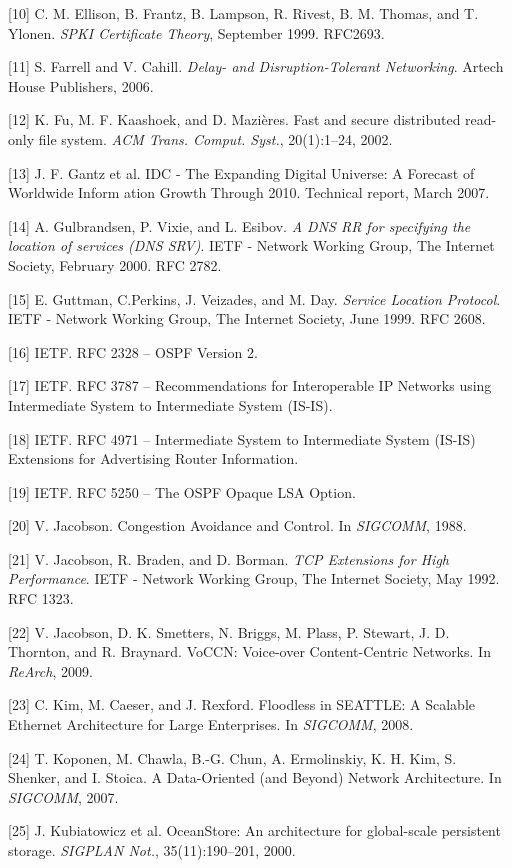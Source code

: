 [10] C. M. Ellison, B. Frantz, B. Lampson, R. Rivest, B. M. Thomas, and T. Ylonen. \emph{SPKI Certificate Theory}, September 1999. RFC2693.

[11] S. Farrell and V. Cahill. \emph{Delay- and Disruption-Tolerant Networking}. Artech House Publishers, 2006.

[12] K. Fu, M. F. Kaashoek, and D. Mazières. Fast and secure distributed read-only file system. \emph{ACM Trans. Comput. Syst.}, 20(1):1–24, 2002.

[13] J. F. Gantz et al. IDC - The Expanding Digital Universe: A Forecast of Worldwide Inform ation Growth Through 2010. Technical report, March 2007.

[14] A. Gulbrandsen, P. Vixie, and L. Esibov. \emph{A DNS RR for specifying the location of services (DNS SRV)}. IETF - Network Working Group, The Internet Society, February 2000. RFC 2782.

[15] E. Guttman, C.Perkins, J. Veizades, and M. Day. \emph{Service Location Protocol}. IETF - Network Working Group, The Internet Society, June 1999. RFC 2608.

[16] IETF. RFC 2328 – OSPF Version 2.

[17] IETF. RFC 3787 – Recommendations for Interoperable IP
Networks using Intermediate System to Intermediate System (IS-IS).

[18] IETF. RFC 4971 – Intermediate System to Intermediate System (IS-IS) Extensions for Advertising Router Information.

[19] IETF. RFC 5250 – The OSPF Opaque LSA Option.

[20] V. Jacobson. Congestion Avoidance and Control. In
\emph{SIGCOMM}, 1988.

[21] V. Jacobson, R. Braden, and D. Borman. \emph{TCP Extensions for
High Performance}. IETF - Network Working Group, The
Internet Society, May 1992. RFC 1323.

[22] V. Jacobson, D. K. Smetters, N. Briggs, M. Plass, P. Stewart,
J. D. Thornton, and R. Braynard. VoCCN: Voice-over
Content-Centric Networks. In \emph{ReArch}, 2009.

[23] C. Kim, M. Caeser, and J. Rexford. Floodless in SEATTLE:
A Scalable Ethernet Architecture for Large Enterprises. In
\emph{SIGCOMM}, 2008.

[24] T. Koponen, M. Chawla, B.-G. Chun, A. Ermolinskiy, K. H.
Kim, S. Shenker, and I. Stoica. A Data-Oriented (and
Beyond) Network Architecture. In \emph{SIGCOMM}, 2007.

[25] J. Kubiatowicz et al. OceanStore: An architecture for
global-scale persistent storage. \emph{SIGPLAN Not.},
35(11):190–201, 2000.


